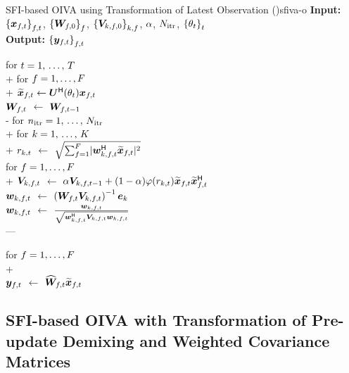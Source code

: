 \documentclass[sip,biber]{now-journal}
\begin{document}
\begin{algorithm}{SFI-based OIVA using Transformation of Latest Observation (\SFIIVAo)}{sfiva-o}
  \textbf{Input:} ${\{\Obs _{\ft}\}} _{\ft}$, ${\{\bm{W} _{f,0}\}} _{f}$, ${\{\bm{V} _{k,f,0}\}} _{k,f}$, $\alpha$, $N _{\mathrm{itr}}$, ${\{\theta _{t}\}} _{t}$ \\
  \textbf{Output:} ${\{\Est _{\ft}\}} _{\ft}$
  \begin{pseudo}
    for $t = 1,\, \dots,\, T$ \\+
      for $f = 1, \dots, F$ \\+
        $\refpos{\Obs} _{\ft} \gets \rotMat ^{\hermite} (\rotSpat _{\tframe}) \Obs _{\ft}$ \ct{\eqref{eq:sfi:obs}} \\
        {$\Demix _{\ft}$} $\gets$ $\Demix _{\ft[-1]}$ \\-
      for $n _{\mathrm{itr}} = 1,\, \dots,\, N _{\mathrm{itr}}$ \\+
        for $k = 1,\, \dots,\, K$ \\+
          {$r _{k,t}$} $\gets$ $\sqrt{\sum _{\freq = 1} ^{\Freq} \abs{\demix _{\src,\ft} ^{\hermite} \refpos{\Obs} _{\ft}} ^2}$ \ct{\eqref{eq:var}} \\
          for $f = 1, \dots, F$ \\+
            {$\cov _{\src,\ft}    $} $\gets$ $\forget \cov _{\src,\ft[-1]} + (1 - \forget) \weight(\var _{\src,\tframe}) \refpos{\Obs} _{\ft} \refpos{\Obs} _{\ft} ^{\hermite}$ \ct{\eqref{eq:cov:rot}} \\
            {$\demix _{\src,\ft}$} $\gets$ $\left(\Demix _{\ft} \cov _{\src,\ft}\right) ^{-1} \eye _{\src}$ \ct{\eqref{eq:ip:proj}} \\
            {$\demix _{\src,\ft}$} $\gets$ $\frac{\demix _{\src,\ft}}{\sqrt{\demix _{\src,\ft} ^{\hermite} \cov _{\src,\ft} \demix _{\src,\ft}}}$ \ct{\eqref{eq:ip:norm}} \\---

      for $f = 1, \dots, F$ \\+
         \ct{\eqref{eq:pb:w}}\\
        {$\Est _{\ft}$} $\gets$ $\proj{\Demix }_{\ft} \refpos{\Obs} _{\ft}$ \ct{\eqref{eq:pb:y}}
  \end{pseudo}
\end{algorithm}

\subsection{SFI-based OIVA with Transformation of Pre-update Demixing and Weighted Covariance Matrices}\label{subsec:proposed:sfiivam}
\end{document}
